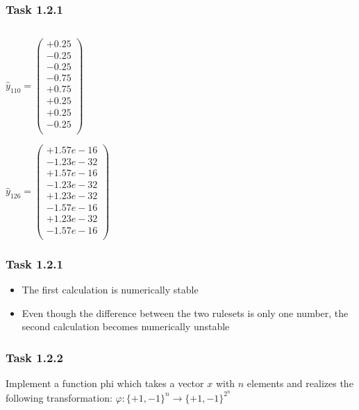 \documentclass[10pt,aspectratio=169,handout]{beamer}
\begin{document}
\begin{frame}
    \frametitle{Task 1.2.1}
    \inputminted[bgcolor=LightGray,fontsize=\small]{python}{calcyhat.py}
    \begin{minipage}{0.45\textwidth}
        $\hat{y}_{110}= \begin{pmatrix}
                +0.25 \\
                -0.25 \\
                -0.25 \\
                -0.75 \\
                +0.75 \\
                +0.25 \\
                +0.25 \\
                -0.25 \\
            \end{pmatrix}$
    \end{minipage}
    \begin{minipage}{0.45\textwidth}
        $\hat{y}_{126}= \begin{pmatrix}
                +1.57e-16 \\
                -1.23e-32 \\
                +1.57e-16 \\
                -1.23e-32 \\
                +1.23e-32 \\
                -1.57e-16 \\
                +1.23e-32 \\
                -1.57e-16 \\
            \end{pmatrix}$
    \end{minipage}
\end{frame}

\begin{frame}
    \frametitle{Task 1.2.1}
    \begin{itemize}
        \item The first calculation is numerically stable
        \item Even though the difference between the two rulesets is only one number, the second calculation becomes numerically unstable
    \end{itemize}
\end{frame}

\begin{frame}
    \frametitle{Task 1.2.2}
    Implement a function phi which takes a vector $x$ with $n$ elements and realizes the following transformation:
    $\varphi : \{+1, -1\}^n \to \{+1, -1\}^{2^n} $
    \inputminted[bgcolor=LightGray,fontsize=\small]{python}{phi.py}
\end{frame}
\end{document}
